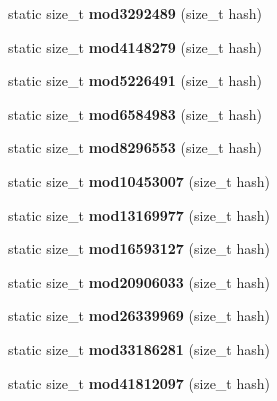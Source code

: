 \begin{DoxyCompactItemize}
\item 
static size\+\_\+t {\bfseries mod3292489} (size\+\_\+t hash)\label{structska_1_1prime__number__hash__policy_a522ceab5bbfaf9215bfb4dc08912ff42}

\item 
static size\+\_\+t {\bfseries mod4148279} (size\+\_\+t hash)\label{structska_1_1prime__number__hash__policy_a90dea8ac4fb413740bc2d1e8238a4643}

\item 
static size\+\_\+t {\bfseries mod5226491} (size\+\_\+t hash)\label{structska_1_1prime__number__hash__policy_af5006b3510982acc8ce58f058a6e949b}

\item 
static size\+\_\+t {\bfseries mod6584983} (size\+\_\+t hash)\label{structska_1_1prime__number__hash__policy_a346919955b2815d3e5c7a93e0720645a}

\item 
static size\+\_\+t {\bfseries mod8296553} (size\+\_\+t hash)\label{structska_1_1prime__number__hash__policy_a63d21d25dd55f6381c505e6838959122}

\item 
static size\+\_\+t {\bfseries mod10453007} (size\+\_\+t hash)\label{structska_1_1prime__number__hash__policy_aaeabebf2fbca6fbae1def66924433864}

\item 
static size\+\_\+t {\bfseries mod13169977} (size\+\_\+t hash)\label{structska_1_1prime__number__hash__policy_aeed2b0a6e871d899aa66c8e20be223a0}

\item 
static size\+\_\+t {\bfseries mod16593127} (size\+\_\+t hash)\label{structska_1_1prime__number__hash__policy_ac482cbe8f036f926ae8226be01997c18}

\item 
static size\+\_\+t {\bfseries mod20906033} (size\+\_\+t hash)\label{structska_1_1prime__number__hash__policy_a1559a4f6eb749baa639afa3234b4507e}

\item 
static size\+\_\+t {\bfseries mod26339969} (size\+\_\+t hash)\label{structska_1_1prime__number__hash__policy_a16466b7fba8b4aa8e8005bed702551e5}

\item 
static size\+\_\+t {\bfseries mod33186281} (size\+\_\+t hash)\label{structska_1_1prime__number__hash__policy_adfa33c7eb09b5e16d47bd4aacadff263}

\item 
static size\+\_\+t {\bfseries mod41812097} (size\+\_\+t hash)\label{structska_1_1prime__number__hash__policy_a19bd140b945234db7ccea3d94c7a2468}


\end{DoxyCompactItemize}
